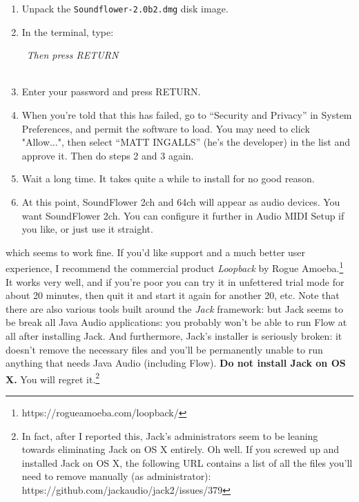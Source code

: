 \documentclass{article}
\newcommand\name{Flow}
\begin{document}
\begin{itemize}
{\begin{enumerate}
\item Unpack the {\tt Soundflower-2.0b2.dmg} disk image.
\item In the terminal, type:
\begin{tabbing}
~\hspace{5em}{\tt cd /Volumes/Soundflower-2.0b2}\hspace{2in}\= {\it Then press RETURN}\\
~\hspace{5em}{\tt sudo installer -pkg Soundflower.pkg -target /}
\end{tabbing}
\item Enter your password and press RETURN.
\item When you're told that this has failed, go to ``Security and Privacy'' in System Preferences, and permit the software to load.  You may need to click "Allow...", then select ``MATT INGALLS'' (he's the developer) in the list and approve it.  Then do steps 2 and 3 again.
\item Wait a long time.  It takes quite a while to install for no good reason.
\item At this point, SoundFlower 2ch and 64ch will appear as audio devices.  You want SoundFlower 2ch.  You can configure it further in Audio MIDI Setup if you like, or just use it straight.
\end{enumerate}
}
which seems to work fine.  If you'd like support and a much better user experience, I recommend the commercial product {\it Loopback} by Rogue Amoeba.\footnote{https:/\!/rogueamoeba.com/loopback/}  It works very well, and if you're poor you can try it in unfettered trial mode for about 20 minutes, then quit it and start it again for another 20, etc.   Note that there are also various tools built around the {\it Jack} framework: but Jack seems to be break all Java Audio applications: you probably won't be able to run {\name} at all after installing Jack.  And furthermore, Jack's installer is seriously broken: it doesn't remove the necessary files and you'll be permanently unable to run anything that needs Java Audio (including {\name}).  {\color{red}\bf Do not install Jack on OS X.}  You will regret it.\footnote{In fact, after I reported this, Jack's administrators seem to be leaning towards eliminating Jack on OS X entirely.  Oh well.  If you screwed up and installed Jack on OS X, the following URL contains a list of all the files you'll need to remove manually (as administrator): https:/\!/github.com/jackaudio/jack2/issues/379}


\end{itemize}
\end{document}
